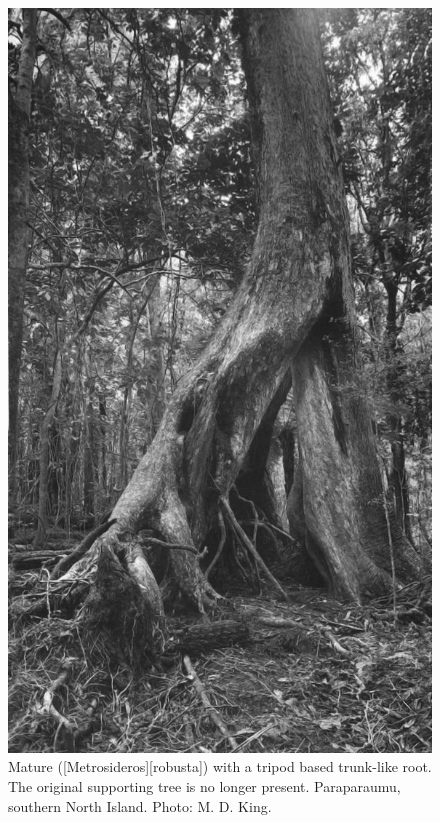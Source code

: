 \begin{figure}[!b]
\begin{minipage}[t]{\textwidth}
\begin{minipage}[t]{(\textwidth-\fgap) * \real{0.46}}
			\centering
			\includegraphics[width=\textwidth]{graphics/fig_051}
			\caption[Mature northern rata with a tripod based trunk-like root]{Mature  ([Metrosideros][robusta]) with a tripod based trunk-like root.
			The original supporting tree is no longer present.
			Paraparaumu, southern North Island.
			Photo: M. D. King.}%
			\label{fig:51rata}
		\end{minipage}
	\end{minipage}
\end{figure}

